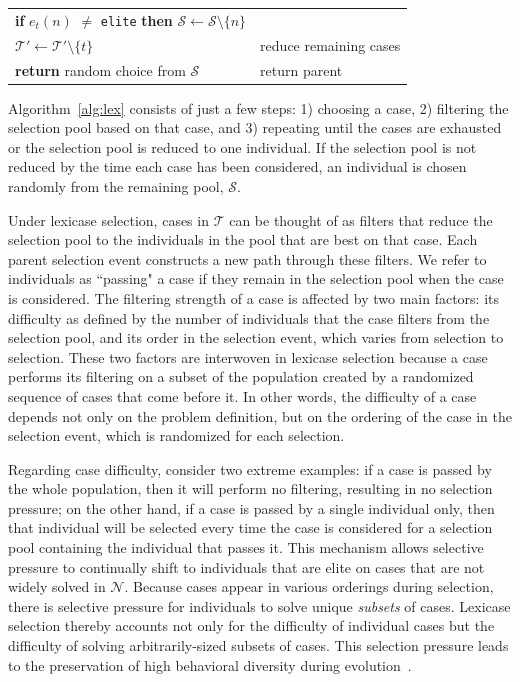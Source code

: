 \documentclass[twoside]{article}
\begin{document}
\begin{algorithm}
{\begin{tabularx}{\textwidth}{lX}
\hspace{1em}\hspace{1em}\hspace{1em}	 \textbf{if} $e_t(n)$ $\neq$ \texttt{elite} \textbf{then}	$\mathcal{S} \leftarrow \mathcal{S} \setminus \{n\}$			&	\\
\hspace{1em}\hspace{1em}	$\mathcal{T'} \leftarrow \mathcal{T'} \setminus \{t\}$ 				&	\hspace{1em}reduce remaining cases\\
\hspace{1em} \textbf{return} random choice from $\mathcal{S}$															&	return parent  
\end{tabularx}
}
\end{algorithm}

Algorithm~\ref{alg:lex} consists of just a few steps: 1) choosing a case, 2) filtering the selection pool based on that case, and 3) repeating until the cases are exhausted or the selection pool is reduced to one individual. If the selection pool is not reduced by the time each case has been considered, an individual is chosen randomly from the remaining pool, $\mathcal{S}$. 

Under lexicase selection, cases in $\mathcal{T}$ can be thought of as filters that reduce the selection pool to the individuals in the pool that are best on that case. Each parent selection event constructs a new path through these filters. We refer to individuals as ``passing" a case if they remain in the selection pool when the case is considered. The filtering strength of a case is affected by two main factors: its difficulty as defined by the number of individuals that the case filters from the selection pool, and its order in the selection event, which varies from selection to selection. These two factors are interwoven in lexicase selection because a case performs its filtering on a subset of the population created by a randomized sequence of cases that come before it. In other words, the difficulty of a case depends not only on the problem definition, but on the ordering of the case in the selection event, which is randomized for each selection.

Regarding case difficulty, consider two extreme examples: if a case is passed by the whole population, then it will perform no filtering, resulting in no selection pressure; on the other hand, if a case is passed by a single individual only, then that individual will be selected every time the case is considered for a selection pool containing the individual that passes it. This mechanism allows selective pressure to continually shift to individuals that are elite on cases that are not widely solved in $\mathcal{N}$. Because cases appear in various orderings during selection, there is selective pressure for individuals to solve unique {\it subsets} of cases. Lexicase selection thereby accounts not only for the difficulty of individual cases but the difficulty of solving arbitrarily-sized subsets of cases. This selection pressure leads to the preservation of high behavioral diversity during evolution~\citep{helmuth_effects_2016, la_cava_epsilon-lexicase_2016}. 
\end{document}
